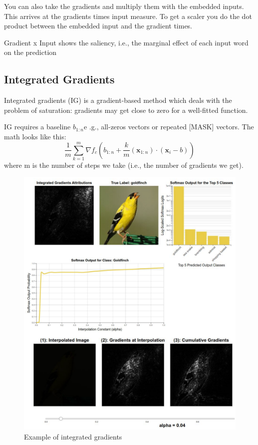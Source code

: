 \documentclass[
  11pt,
  british,
]{article}
\begin{document}
You can also take the gradients and multiply them with the embedded
inputs. This arrives at the gradients times input measure. To get a
scaler you do the dot product between the embedded input and the
gradient times.

Gradient x Input shows the saliency, i.e., the marginal effect of each
input word on the prediction

\hypertarget{integrated-gradients}{%
\subsection{Integrated Gradients}\label{integrated-gradients}}

Integrated gradients (IG) is a gradient-based method which deals with
the problem of saturation: gradients may get close to zero for a
well-fitted function.

IG requires a baseline \(b_{1:n}\)e .g., all-zeros vectors or repeated
{[}MASK{]} vectors. The math looks like this:
\[\frac{1}{m}\sum\limits^{m}_{k=1} \nabla f_c(b_{1:n}+\frac{k}{m}(\mathbf{x}_{1:n}) \cdot (\mathbf{x}_i-b))\]
where m is the number of steps we take (i.e., the number of gradients we
get).

\begin{figure}
\centering
\includegraphics{Pasted_image_20220606165428.png}
\caption{Example of integrated gradients}
\end{figure}
\end{document}
